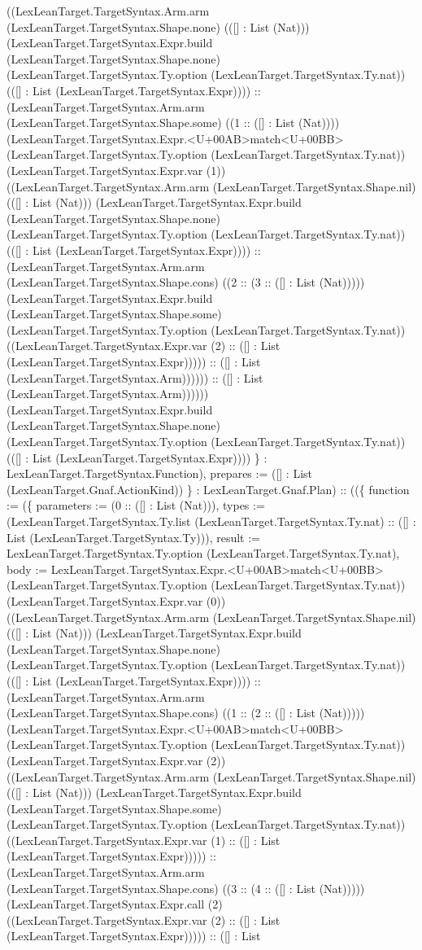 \documentclass[11pt]{article}
\begin{document}
((LexLeanTarget.TargetSyntax.Arm.arm (LexLeanTarget.TargetSyntax.Shape.none) (([] : List (Nat))) (LexLeanTarget.TargetSyntax.Expr.build (LexLeanTarget.TargetSyntax.Shape.none) (LexLeanTarget.TargetSyntax.Ty.option (LexLeanTarget.TargetSyntax.Ty.nat)) (([] : List (LexLeanTarget.TargetSyntax.Expr)))) :: (LexLeanTarget.TargetSyntax.Arm.arm (LexLeanTarget.TargetSyntax.Shape.some) ((1 :: ([] : List (Nat)))) (LexLeanTarget.TargetSyntax.Expr.<U+00AB>match<U+00BB> (LexLeanTarget.TargetSyntax.Ty.option (LexLeanTarget.TargetSyntax.Ty.nat)) (LexLeanTarget.TargetSyntax.Expr.var (1)) ((LexLeanTarget.TargetSyntax.Arm.arm (LexLeanTarget.TargetSyntax.Shape.nil) (([] : List (Nat))) (LexLeanTarget.TargetSyntax.Expr.build (LexLeanTarget.TargetSyntax.Shape.none) (LexLeanTarget.TargetSyntax.Ty.option (LexLeanTarget.TargetSyntax.Ty.nat)) (([] : List (LexLeanTarget.TargetSyntax.Expr)))) :: (LexLeanTarget.TargetSyntax.Arm.arm (LexLeanTarget.TargetSyntax.Shape.cons) ((2 :: (3 :: ([] : List (Nat))))) (LexLeanTarget.TargetSyntax.Expr.build (LexLeanTarget.TargetSyntax.Shape.some) (LexLeanTarget.TargetSyntax.Ty.option (LexLeanTarget.TargetSyntax.Ty.nat)) ((LexLeanTarget.TargetSyntax.Expr.var (2) :: ([] : List (LexLeanTarget.TargetSyntax.Expr))))) :: ([] : List (LexLeanTarget.TargetSyntax.Arm)))))) :: ([] : List (LexLeanTarget.TargetSyntax.Arm)))))) (LexLeanTarget.TargetSyntax.Expr.build (LexLeanTarget.TargetSyntax.Shape.none) (LexLeanTarget.TargetSyntax.Ty.option (LexLeanTarget.TargetSyntax.Ty.nat)) (([] : List (LexLeanTarget.TargetSyntax.Expr)))) \} : LexLeanTarget.TargetSyntax.Function), prepares := ([] : List (LexLeanTarget.Gnaf.ActionKind)) \} : LexLeanTarget.Gnaf.Plan) :: ((\{ function := (\{ parameters := (0 :: ([] : List (Nat))), types := (LexLeanTarget.TargetSyntax.Ty.list (LexLeanTarget.TargetSyntax.Ty.nat) :: ([] : List (LexLeanTarget.TargetSyntax.Ty))), result := LexLeanTarget.TargetSyntax.Ty.option (LexLeanTarget.TargetSyntax.Ty.nat), body := LexLeanTarget.TargetSyntax.Expr.<U+00AB>match<U+00BB> (LexLeanTarget.TargetSyntax.Ty.option (LexLeanTarget.TargetSyntax.Ty.nat)) (LexLeanTarget.TargetSyntax.Expr.var (0)) ((LexLeanTarget.TargetSyntax.Arm.arm (LexLeanTarget.TargetSyntax.Shape.nil) (([] : List (Nat))) (LexLeanTarget.TargetSyntax.Expr.build (LexLeanTarget.TargetSyntax.Shape.none) (LexLeanTarget.TargetSyntax.Ty.option (LexLeanTarget.TargetSyntax.Ty.nat)) (([] : List (LexLeanTarget.TargetSyntax.Expr)))) :: (LexLeanTarget.TargetSyntax.Arm.arm (LexLeanTarget.TargetSyntax.Shape.cons) ((1 :: (2 :: ([] : List (Nat))))) (LexLeanTarget.TargetSyntax.Expr.<U+00AB>match<U+00BB> (LexLeanTarget.TargetSyntax.Ty.option (LexLeanTarget.TargetSyntax.Ty.nat)) (LexLeanTarget.TargetSyntax.Expr.var (2)) ((LexLeanTarget.TargetSyntax.Arm.arm (LexLeanTarget.TargetSyntax.Shape.nil) (([] : List (Nat))) (LexLeanTarget.TargetSyntax.Expr.build (LexLeanTarget.TargetSyntax.Shape.some) (LexLeanTarget.TargetSyntax.Ty.option (LexLeanTarget.TargetSyntax.Ty.nat)) ((LexLeanTarget.TargetSyntax.Expr.var (1) :: ([] : List (LexLeanTarget.TargetSyntax.Expr))))) :: (LexLeanTarget.TargetSyntax.Arm.arm (LexLeanTarget.TargetSyntax.Shape.cons) ((3 :: (4 :: ([] : List (Nat))))) (LexLeanTarget.TargetSyntax.Expr.call (2) ((LexLeanTarget.TargetSyntax.Expr.var (2) :: ([] : List (LexLeanTarget.TargetSyntax.Expr))))) :: ([] : List 
\end{document}
